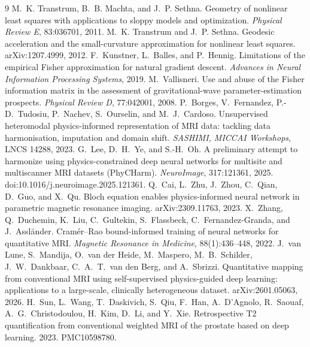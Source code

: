 \documentclass{article}
\begin{document}

\begin{thebibliography}{9}
 M.~K. Transtrum, B.~B. Machta, and J.~P. Sethna.
  Geometry of nonlinear least squares with applications to sloppy models and optimization.
  \emph{Physical Review E}, 83:036701, 2011.
 M.~K. Transtrum and J.~P. Sethna.
  Geodesic acceleration and the small-curvature approximation for nonlinear least squares.
  arXiv:1207.4999, 2012.
 F.~Kunstner, L.~Balles, and P.~Hennig.
  Limitations of the empirical Fisher approximation for natural gradient descent.
  \emph{Advances in Neural Information Processing Systems}, 2019.
 M.~Vallisneri.
  Use and abuse of the Fisher information matrix in the assessment of gravitational-wave
  parameter-estimation prospects. \emph{Physical Review D}, 77:042001, 2008.
 P.~Borges, V.~Fernandez, P.-D.~Tudosiu, P.~Nachev, S.~Ourselin, and
  M.~J.~Cardoso.
  Unsupervised heteromodal physics-informed representation of MRI data: tackling data
  harmonisation, imputation and domain shift. \emph{SASHIMI, MICCAI Workshops},
  LNCS 14288, 2023.
 G.~Lee, D.~H.~Ye, and S.-H.~Oh. A preliminary attempt to harmonize
  using physics-constrained deep neural networks for multisite and multiscanner MRI datasets
  (PhyCHarm). \emph{NeuroImage}, 317:121361, 2025. doi:10.1016/j.neuroimage.2025.121361.
 Q.~Cai, L.~Zhu, J.~Zhou, C.~Qian, D.~Guo, and X.~Qu.
  Bloch equation enables physics-informed neural network in parametric magnetic resonance
  imaging. arXiv:2309.11763, 2023.
 X.~Zhang, Q.~Duchemin, K.~Liu, C.~Gultekin, S.~Flassbeck,
  C.~Fernandez-Granda, and J.~Assl\"ander. Cram\'er--Rao bound-informed training of neural
  networks for quantitative MRI. \emph{Magnetic Resonance in Medicine}, 88(1):436--448, 2022.
 J.~van Lune, S.~Mandija, O.~van der Heide, M.~Maspero, M.~B.~Schilder,
  J.~W.~Dankbaar, C.~A.~T.~van den Berg, and A.~Sbrizzi. Quantitative mapping from conventional
  MRI using
  self-supervised physics-guided deep learning: applications to a large-scale, clinically
  heterogeneous dataset. arXiv:2601.05063, 2026.
 H.~Sun, L.~Wang, T.~Daskivich, S.~Qiu, F.~Han, A.~D'Agnolo, R.~Saouaf,
  A.~G.~Christodoulou, H.~Kim, D.~Li, and Y.~Xie. Retrospective T2 quantification from
  conventional weighted MRI of the prostate based on deep learning. 2023. PMC10598780.
\end{thebibliography}
\end{document}
